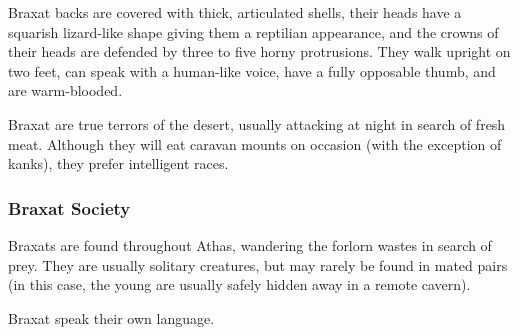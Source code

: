 Braxat backs are covered with thick, articulated shells, their heads have a squarish lizard-like shape giving them a reptilian appearance, and the crowns of their heads are defended by three to five horny protrusions. They walk upright on two feet, can speak with a human-like voice, have a fully opposable thumb, and are warm-blooded.

Braxat are true terrors of the desert, usually attacking at night in search of fresh meat. Although they will eat caravan mounts on occasion (with the exception of kanks), they prefer intelligent races.

\subsubsection{Braxat Society}
Braxats are found throughout Athas, wandering the forlorn wastes in search of prey. They are usually solitary creatures, but may rarely be found in mated pairs (in this case, the young are usually safely hidden away in a remote cavern).

Braxat speak their own language.


